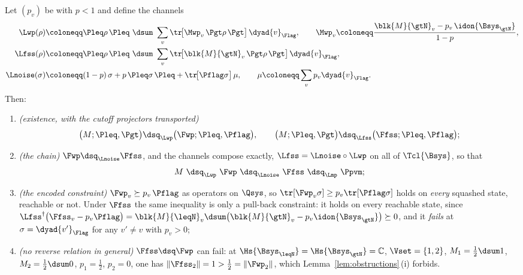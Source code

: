 \begin{proposition}
\label{prop:chain}
Let $(p_v)$ be  with $p<1$ and define the channels
\begin{align}
  \Lwp(\rho)
   &\coloneqq\Pleq\rho\,\Pleq\ \dsum\
      \sum_{v}\tr\!\big[\Mwp_v\,\Pgt\rho\,\Pgt\big]\,\dyad{v}_{\Flag},
   \qquad
   \Mwp_v\coloneqq\frac{\blk{M}{\gtN}_v-p_v\,\idon{\Bsys_{\gtN}}}{1-p},
   \label{eq:Lwp}\\
  \Lfss(\rho)
   &\coloneqq\Pleq\rho\,\Pleq\ \dsum\
      \sum_{v}\tr\!\big[\blk{M}{\gtN}_v\,\Pgt\rho\,\Pgt\big]\,\dyad{v}_{\Flag},
   \label{eq:Lfss}\\
  \Lnoise(\sigma)
   &\coloneqq(1-p)\,\sigma+p\,\Pleq\sigma\,\Pleq
      +\tr\!\big[\Pflag\sigma\big]\,\mu,
   \qquad \mu\coloneqq\sum_vp_v\dyad{v}_{\Flag}.
   \label{eq:Lnoise}
\end{align}
Then:
\begin{enumerate}[label=(\roman*),leftmargin=3.0em]
\item \emph{(existence, with the cutoff projectors transported)}
  \begin{equation}\label{eq:transportproj}
    \big(M;\Pleq,\Pgt\big)\dsq_{\Lwp}\big(\Fwp;\Pleq,\Pflag\big),
    \qquad
    \big(M;\Pleq,\Pgt\big)\dsq_{\Lfss}\big(\Ffss;\Pleq,\Pflag\big);
  \end{equation}
\item \emph{(the chain)} $\Fwp\dsq_{\Lnoise}\Ffss$, and the channels compose
  exactly, $\Lfss=\Lnoise\circ\Lwp$ on all of $\Tcl{\Bsys}$, so that
  \begin{equation}\label{eq:ladder}
    M\ \dsq_{\Lwp}\ \Fwp\ \dsq_{\Lnoise}\ \Ffss\ \dsq_{\Lmp}\ \Ppvm ;
  \end{equation}
\item \emph{(the encoded constraint)} $\Fwp_v\succeq p_v\,\Pflag$ as operators
  on $\Qsys$, so $\tr[\Fwp_v\sigma]\ge p_v\tr[\Pflag\sigma]$ holds on
  \emph{every} squashed state, reachable or not. Under $\Ffss$ the same
  inequality is only a pull-back constraint: it holds on every reachable state,
  since
  $\Lfss^{\dagger}\big(\Ffss_v-p_v\Pflag\big)
  =\blk{M}{\leqN}_v\dsum\big(\blk{M}{\gtN}_v-p_v\idon{\Bsys_{\gtN}}\big)
  \succeq0$, and it \emph{fails} at $\sigma=\dyad{v'}_{\Flag}$ for any $v'\ne v$
  with $p_v>0$;
\item \emph{(no reverse relation in general)} $\Ffss\dsq\Fwp$ can fail: at
  $\Hs{\Bsys_{\leqN}}=\Hs{\Bsys_{\gtN}}=\mathbb{C}$, $\Vset=\{1,2\}$,
  $M_1=\tfrac12\dsum1$, $M_2=\tfrac12\dsum0$, $p_1=\tfrac12$, $p_2=0$, one has
  $\|\Ffss_2\|=1>\tfrac12=\|\Fwp_2\|$, which
  Lemma~\ref{lem:obstructions}\,(i) forbids.
\end{enumerate}
\end{proposition}


